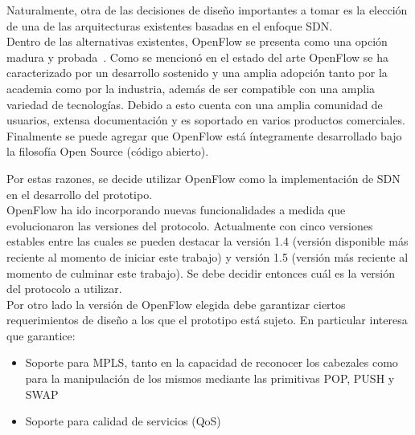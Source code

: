 Naturalmente, otra de las decisiones de dise\~no importantes a tomar es la elecci\'on de una de las arquitecturas existentes basadas en el enfoque SDN.\\
  
Dentro de las alternativas existentes, OpenFlow se presenta como una opci\'on madura y probada~\citep{Ofelia}. Como se mencion\'o en el estado del arte OpenFlow  se ha caracterizado por un desarrollo sostenido y una amplia adopci\'on tanto por la academia como por la industria, adem\'as de ser compatible con una amplia variedad de tecnolog\'ias. Debido a esto cuenta con una amplia comunidad de usuarios, extensa documentaci\'on y es soportado en varios productos comerciales\citep{Pica8}\citep{HP}\citep{Centec}\citep{SDNProductlist}. Finalmente se puede agregar que OpenFlow est\'a íntegramente desarrollado bajo la filosof\'ia Open Source (c\'odigo abierto). 

Por estas razones, se decide utilizar OpenFlow como la implementaci\'on de SDN en el desarrollo del prototipo.\\






OpenFlow ha ido incorporando nuevas funcionalidades a medida que evolucionaron las versiones del protocolo. Actualmente con cinco versiones estables entre las cuales se pueden destacar la versi\'on 1.4 (versi\'on disponible m\'as reciente al momento de iniciar este trabajo) y versi\'on 1.5 (versi\'on m\'as reciente al momento de culminar este trabajo). Se debe decidir entonces cu\'al es la versi\'on del protocolo a utilizar.\\

Por otro lado la versi\'on de OpenFlow elegida debe garantizar ciertos requerimientos de dise\~no a los que el prototipo est\'a sujeto. En particular interesa que garantice:

\begin{itemize}
\item Soporte para MPLS, tanto en la capacidad de reconocer los cabezales como para la manipulaci\'on de los mismos mediante las primitivas POP, PUSH y SWAP
\item Soporte para calidad de servicios (QoS)
\end{itemize}

